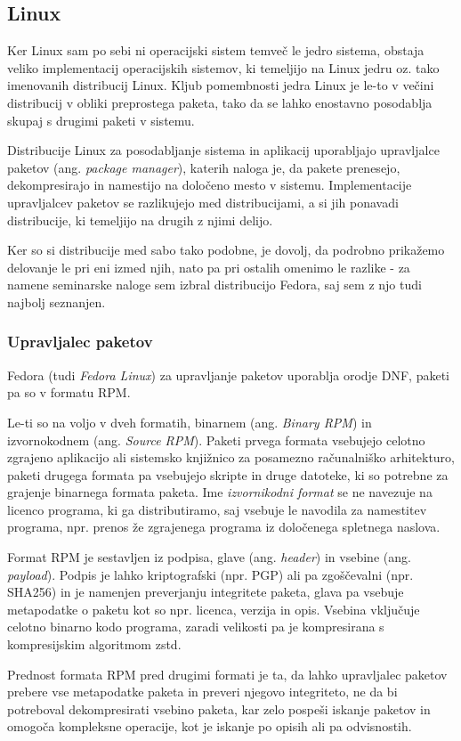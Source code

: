 \subsection{Linux}

Ker Linux sam po sebi ni operacijski sistem temveč le jedro sistema, obstaja veliko implementacij operacijskih sistemov,
ki temeljijo na Linux jedru oz. tako imenovanih distribucij Linux.
Kljub pomembnosti jedra Linux je le-to v večini distribucij v obliki preprostega paketa, tako da se lahko enostavno
posodablja skupaj s drugimi paketi v sistemu.

Distribucije Linux za posodabljanje sistema in aplikacij uporabljajo upravljalce paketov (ang. \emph{package manager}),
katerih naloga je, da pakete prenesejo, dekompresirajo in namestijo na določeno mesto v sistemu.
Implementacije upravljalcev paketov se razlikujejo med distribucijami, a si jih ponavadi distribucije, ki temeljijo na
drugih z njimi delijo.

Ker so si distribucije med sabo tako podobne, je dovolj, da podrobno prikažemo delovanje le pri eni izmed njih, nato
pa pri ostalih omenimo le razlike - za namene seminarske naloge sem izbral distribucijo Fedora, saj sem z njo tudi
najbolj seznanjen.



\subsubsection{Upravljalec paketov}

Fedora (tudi \emph{Fedora Linux}) za upravljanje paketov uporablja orodje DNF, paketi pa so v formatu RPM.

Le-ti so na voljo v dveh formatih, binarnem (ang. \emph{Binary RPM}) in izvornokodnem (ang. \emph{Source RPM}).
Paketi prvega formata vsebujejo celotno zgrajeno aplikacijo ali sistemsko knjižnico za posamezno
računalniško arhitekturo, paketi drugega formata pa vsebujejo skripte in druge datoteke, ki so potrebne za grajenje
binarnega formata paketa.
Ime \emph{izvornikodni format} se ne navezuje na licenco programa, ki ga distributiramo, saj vsebuje le navodila
za namestitev programa, npr. prenos že zgrajenega programa iz določenega spletnega naslova.

Format RPM je sestavljen iz podpisa, glave (ang. \emph{header}) in vsebine (ang. \emph{payload}).
Podpis je lahko kriptografski (npr. PGP) ali pa zgoščevalni (npr. SHA256) in je namenjen preverjanju integritete paketa,
glava pa vsebuje metapodatke o paketu kot so npr. licenca, verzija in opis.
Vsebina vključuje celotno binarno kodo programa, zaradi velikosti pa je kompresirana s kompresijskim algoritmom zstd.

Prednost formata RPM pred drugimi formati je ta, da lahko upravljalec paketov prebere vse metapodatke paketa in preveri
njegovo integriteto, ne da bi potreboval dekompresirati vsebino paketa, kar zelo pospeši iskanje paketov in omogoča
kompleksne operacije, kot je iskanje po opisih ali pa odvisnostih.